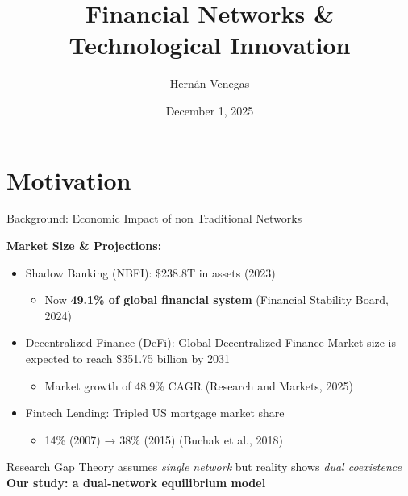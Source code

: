 \documentclass[aspectratio=169]{beamer}
\title[Financial Networks]{Financial Networks \& Technological Innovation}
\author{Hernán Venegas}
\institute{Universidad de Los Andes}
\date{December 1, 2025}
\begin{document}
\frame{\titlepage}

\section{Motivation}

\begin{frame}{Background: Economic Impact of non Traditional Networks}

\textbf{Market Size \& Projections:}

\begin{itemize}
    \item \alert{Shadow Banking (NBFI)}: \$238.8T in assets (2023)
    \begin{itemize}
        \item[-] Now \textbf{49.1\% of global financial system} (Financial Stability Board, 2024)
    \end{itemize}
    
    \vspace{0.3cm}
    
    \item \alert{Decentralized Finance (DeFi)}: Global Decentralized Finance Market size is expected to reach \$351.75 billion by 2031
    \begin{itemize}
        \item[-] Market growth of 48.9\% CAGR (Research and Markets, 2025)
    \end{itemize}
    
    \vspace{0.3cm}
    
    \item \alert{Fintech Lending}: Tripled US mortgage market share
    \begin{itemize}
        \item[-] 14\% (2007) → 38\% (2015) (Buchak et al., 2018)
    \end{itemize}
\end{itemize}

\vspace{0.4cm}

\begin{alertblock}{Research Gap}
\centering
Theory assumes \textit{single network} but reality shows \textit{dual coexistence}\\
\textbf{Our study: a dual-network equilibrium model}
\end{alertblock}

\end{frame}
\end{document}

